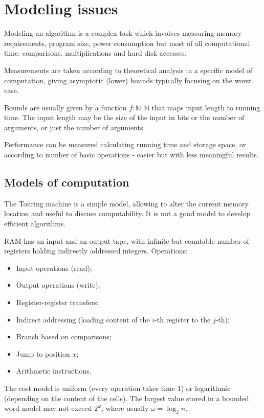 \section{Modeling issues}
Modeling an algorithm is a complex task which involves measuring memory requirements, program size, power consumption but most of all computational time: comparisons, multiplications and hard disk accesses.

Measurements are taken according to theoretical analysis in a specific model of computation, giving asymptotic (lower) bounds typically focusing on the worst case. 

Bounds are usually given by a function $f : \mathbb{N} : \mathbb{N}$ that maps input length to running time. The input length may be the size of the input in bits or the number of arguments, or just the number of arguments.

Performance can be measured calculating running time and storage space, or according to number of basic operations - easier but with less meaningful results.

\subsection{Models of computation}
The Touring machine is a simple model, allowing to alter the current memory location and useful to discuss computability. It is not a good model to develop efficient algorithms.

RAM has an input and an output tape, with infinite but countable number of registers holding indirectly addressed integers. Operations:
\begin{itemize}
	\item Input operations (read);
	\item Output operations (write);
	\item Register-register transfers;
	\item Indirect addressing (loading content of the $i$-th register to the $j$-th);
	\item Branch based on comparisons;
	\item Jump to position $x$;
	\item Arithmetic instructions.
\end{itemize}
The cost model is uniform (every operation takes time 1) or logarithmic (depending on the content of the cells). The largest value stored in a bounded word model may not exceed $2^\omega$, where usually $\omega = \log_2 n$.

